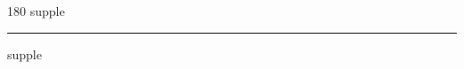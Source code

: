 
\begin{frame}
\begin{center}
\begin{turn}{180}
{\fontsize{2.5cm}{1em}\selectfont supple}
\end{turn}
\vspace{1em}\par  
\hrule
\vspace{1em}\par  
{\fontsize{2.5cm}{1em}\selectfont supple}
\end{center}
\end{frame}

